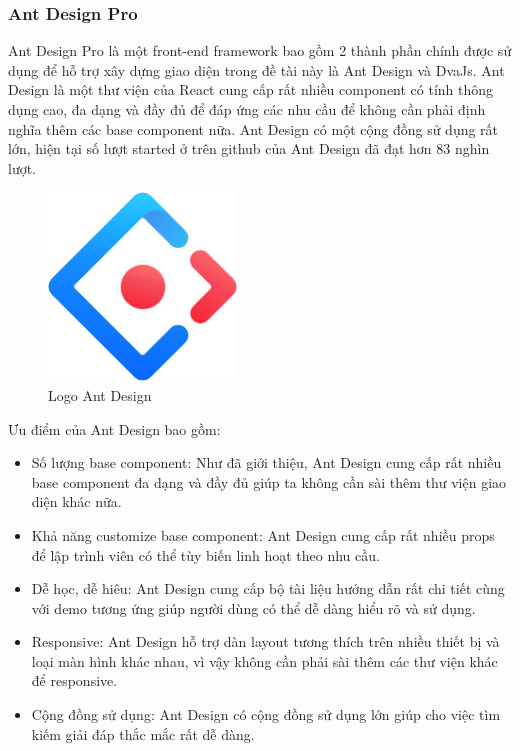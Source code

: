         \subsubsection{Ant Design Pro}
            \hspace*{0.5cm} Ant Design Pro là một front-end framework bao gồm 2 thành phần chính được sử dụng để hỗ trợ xây dựng giao diện trong đề tài này là Ant Design và DvaJs.
            \hspace*{0.5cm} Ant Design là một thư viện của React cung cấp rất nhiều component có tính thông dụng cao, đa dạng và đầy đủ để đáp ứng các nhu cầu để không cần phải định nghĩa thêm các base component nữa. Ant Design có một cộng đồng sử dụng rất lớn, hiện tại số lượt started ở trên github của Ant Design đã đạt hơn 83 nghìn lượt.
            
            \begin{figure}[!htp]
                \begin{center}
                \includegraphics[width=5cm]{img/Technology/antd.jpg}
                \end{center}
                \caption{Logo Ant Design}
            \end{figure}

            \hspace*{0.5cm} Ưu điểm của Ant Design bao gồm:
            \begin{itemize}
                \item Số lượng base component: Như đã giới thiệu, Ant Design cung cấp rất nhiều base component đa dạng và đầy đủ giúp ta không cần sài thêm thư viện giao diện khác nữa.
                \item Khả năng customize base component: Ant Design cung cấp rất nhiều props để lập trình viên có thể tùy biến linh hoạt theo nhu cầu.
                \item Dễ học, dễ hiêu: Ant Design cung cấp bộ tài liệu hướng dẫn rất chi tiết cùng với demo tương ứng giúp người dùng có thể dễ dàng hiểu rõ và sử dụng.
                \item Responsive: Ant Design hỗ trợ dàn layout tương thích trên nhiều thiết bị và loại màn hình khác nhau, vì vậy không cần phải sài thêm các thư viện khác để responsive.
                \item Cộng đồng sử dụng: Ant Design có cộng đồng sử dụng lớn giúp cho việc tìm kiếm giải đáp thắc mắc rất dễ dàng.
            \end{itemize}

